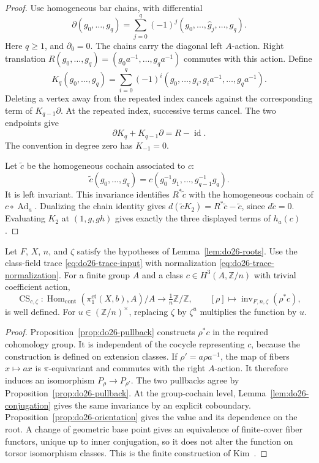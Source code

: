 \begin{proof}
Use homogeneous bar chains, with differential
\[
 \partial(g_0,\ldots,g_q)=
 \sum_{j=0}^{q}(-1)^j(g_0,\ldots,\widehat g_j,\ldots,g_q).
\]
Here \(q\geq1\), and \(\partial_0=0\).
The chains carry the diagonal left \(A\)-action.  Right translation
\(R(g_0,\ldots,g_q)=(g_0a^{-1},\ldots,g_qa^{-1})\) commutes
with this action.  Define
\[
 K_q(g_0,\ldots,g_q)=
 \sum_{i=0}^{q}(-1)^i
 (g_0,\ldots,g_i,g_i a^{-1},\ldots,g_q a^{-1}).
\]
Deleting a vertex away from the repeated index cancels against the
corresponding term of \(K_{q-1}\partial\).  At the repeated index,
successive terms cancel.  The two endpoints give
\[
 \partial K_q+K_{q-1}\partial=R-\operatorname{id}.
\]
The convention in degree zero has \(K_{-1}=0\).

Let \(\widetilde c\) be the homogeneous cochain associated to \(c\):
\[
 \widetilde c(g_0,\ldots,g_q)=
 c(g_0^{-1}g_1,\ldots,g_{q-1}^{-1}g_q).
\]
It is left invariant.  This invariance identifies \(R^*\widetilde c\)
with the homogeneous cochain of \(c\circ\operatorname{Ad}_a\).
Dualizing the chain identity gives
\(d(\widetilde c K_2)=R^*\widetilde c-\widetilde c\), since
\(d\widetilde c=0\).  Evaluating \(K_2\) at \((1,g,gh)\)
gives exactly the three displayed terms of \(h_a(c)\).
\end{proof}

\begin{theorem}
\label{thm:do26-kim}\label{thm:kim}
Let \(F\), \(X\), \(n\), and \(\zeta\) satisfy the hypotheses of
Lemma~\ref{lem:do26-roots}.  Use the class-field trace
\eqref{eq:do26-trace-input} with normalization
\eqref{eq:do26-trace-normalization}.  For a finite group \(A\) and a
class \(c\in H^3(A,\mathbb Z/n)\) with trivial coefficient action,
\[
 \operatorname{CS}_{c,\zeta}:
 \operatorname{Hom}_{\mathrm{cont}}(\pi_1^{\mathrm{et}}(X,b),A)/A
   \longrightarrow\tfrac1n\mathbb Z/\mathbb Z,
 \qquad [\rho]\longmapsto
       \operatorname{inv}_{F,n,\zeta}(\rho^*c),
\]
is well defined. For \(u\in(\mathbb Z/n)^\times\), replacing
\(\zeta\) by \(\zeta^u\) multiplies the function by \(u\).
\end{theorem}

\begin{proof}
Proposition~\ref{prop:do26-pullback} constructs \(\rho^*c\) in the
required cohomology group.  It is independent of the cocycle representing
\(c\), because the construction is defined on extension classes.
If \(\rho'=a\rho a^{-1}\), the map of fibers \(x\mapsto ax\)
is \(\pi\)-equivariant and commutes with the right \(A\)-action.
It therefore induces an isomorphism \(P_\rho\to P_{\rho'}\).
The two pullbacks agree by Proposition~\ref{prop:do26-pullback}.
At the group-cochain level, Lemma~\ref{lem:do26-conjugation} gives
the same invariance by an explicit coboundary.
Proposition~\ref{prop:do26-orientation} gives the value and its
dependence on the root.  A change of geometric base point gives an
equivalence of finite-cover fiber functors, unique up to inner
conjugation, so it does not alter the function on torsor isomorphism
classes.  This is the finite construction of
Kim~\cite[\S1, pp.~1--3]{Kim2016}.
\end{proof}

